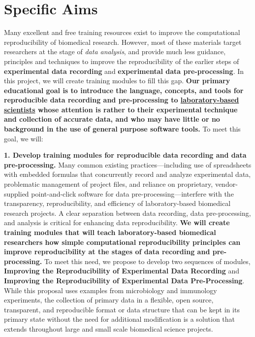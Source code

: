 \documentclass[pdftex,english,11.5pt,parskip=half]{scrartcl}
\begin{document}
\def\bf{\normalfont\bfseries}
\pagestyle{empty}

\section*{Specific Aims}
\begingroup
    \fontsize{11pt}{12pt}\selectfont 
    
Many excellent and free training resources exist to improve the computational reproducibility of biomedical research. However, most of these materials target researchers at the stage of \textit{data analysis}, and provide much less guidance, principles and techniques to improve the 
reproducibility of the earlier steps of \textbf{experimental data recording} and \textbf{experimental data pre-processing}. In this project, we will create training modules to fill this gap. \textbf{Our primary educational goal is to introduce the language, concepts, and tools for reproducible data recording and pre-processing to \underline{laboratory-based scientists} whose attention is rather to 
their experimental technique and collection of accurate data, and who may have little or no background 
in the use of general purpose software tools.} To meet this goal, we will:

\textbf{1. Develop training modules for reproducible data recording and data pre-processing.} 
Many common existing practices---including use of spreadsheets with embedded formulas that 
concurrently record and analyze experimental data, problematic management of project files,
and reliance on proprietary, vendor-supplied point-and-click software for data
pre-processing---interfere with the transparency, reproducibility, and
efficiency of laboratory-based biomedical research projects. A clear separation between data 
recording, data pre-processing, and analysis is critical for enhancing data reproducibility. \textbf{We will create training modules that will teach laboratory-based biomedical
researchers how simple computational reproducibility principles can improve
reproducibility at the stages of data recording and
pre-processing.} To meet this need, we propose to develop two sequences of modules, \textbf{Improving the
Reproducibility of Experimental Data Recording} and \textbf{Improving the
Reproducibility of Experimental Data Pre-Processing}. 
While this proposal uses examples from microbiology 
and immunology experiments, the collection of primary data in a flexible, open source, 
transparent, and reproducible format or data structure that can be kept in its primary state 
without the need for additional modification is a solution that extends throughout large and 
small scale biomedical science projects.
\end{document}
